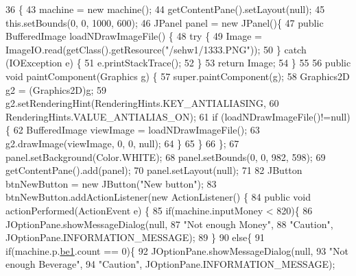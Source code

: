 \begin{DoxyCode}
36                           \{
43         machine = \textcolor{keyword}{new} machine();
44         getContentPane().setLayout(null);
45         this.setBounds(0, 0, 1000, 600);
46         JPanel panel = \textcolor{keyword}{new} JPanel()\{
47             \textcolor{keyword}{public} BufferedImage loadNDrawImageFile() \{
48                 \textcolor{keywordflow}{try} \{
49                     Image = ImageIO.read(getClass().getResource(\textcolor{stringliteral}{"/sehw1/1333.PNG"}));
50                     \} \textcolor{keywordflow}{catch} (IOException e) \{
51                         e.printStackTrace();
52                         \}
53                 \textcolor{keywordflow}{return} Image;
54                 \}
55             
56             \textcolor{keyword}{public} \textcolor{keywordtype}{void} paintComponent(Graphics g) \{
57                 super.paintComponent(g);
58                 Graphics2D g2 = (Graphics2D)g;
59                 g2.setRenderingHint(RenderingHints.KEY\_ANTIALIASING,
60                         RenderingHints.VALUE\_ANTIALIAS\_ON);
61                 \textcolor{keywordflow}{if} (loadNDrawImageFile()!=null) \{
62                     BufferedImage viewImage = loadNDrawImageFile();         
63                     g2.drawImage(viewImage, 0, 0, null);
64                     \}
65                 \} 
66         \};
67         panel.setBackground(Color.WHITE);
68         panel.setBounds(0, 0, 982, 598);
69         getContentPane().add(panel);
70         panel.setLayout(null);
71         
82         JButton btnNewButton = \textcolor{keyword}{new} JButton(\textcolor{stringliteral}{"New button"});
83         btnNewButton.addActionListener(\textcolor{keyword}{new} ActionListener() \{
84             \textcolor{keyword}{public} \textcolor{keywordtype}{void} actionPerformed(ActionEvent e) \{
85                 \textcolor{keywordflow}{if}(machine.inputMoney < 820)\{
86                     JOptionPane.showMessageDialog(null,
87                             \textcolor{stringliteral}{"Not enough Money"}, 
88                             \textcolor{stringliteral}{"Caution"}, JOptionPane.INFORMATION\_MESSAGE);
89                 \}
90                 \textcolor{keywordflow}{else}\{
91                     \textcolor{keywordflow}{if}(machine.p.\hyperlink{classsehw1_1_1product_a78de5ce35a2661747de59366b041bf28}{be1}.count == 0)\{
92                         JOptionPane.showMessageDialog(null,
93                                 \textcolor{stringliteral}{"Not enough Beverage"}, 
94                                 \textcolor{stringliteral}{"Caution"}, JOptionPane.INFORMATION\_MESSAGE);

\end{DoxyCode}
